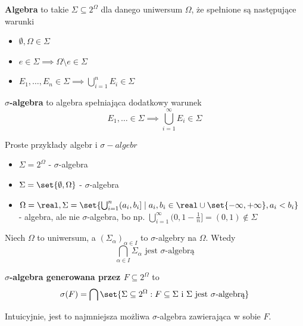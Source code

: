 \begin{definition}
	\textbf{Algebra} to takie \(\Sigma \subseteq 2^{\Omega}\) dla danego uniwersum \(\Omega\), że spełnione są następujące warunki
	\begin{itemize}
		\item \(\emptyset, \Omega \in \Sigma\)
		\item \(e \in \Sigma \implies \Omega \setminus e \in \Sigma\)
		\item \(E_1, \dots, E_n \in \Sigma \implies \bigcup_{i=1}^n E_i \in \Sigma\)
	\end{itemize}
\end{definition}

\begin{definition}
	\label{sigma-algebra-definition}
	\textbf{\(\sigma\)-algebra} to algebra spełniająca dodatkowy warunek
	\[
		E_1, \dots \in \Sigma \implies \bigcup_{i=1}^{\infty} E_i \in \Sigma
	\]
\end{definition}

\begin{example}
	Proste przykłady algebr i \(\sigma-algebr\)
	\begin{itemize}
		\item \(\Sigma = 2^{\Omega}\) - \(\sigma\)-algebra
		\item \(\Sigma = \set{\emptyset, \Omega}\) - \(\sigma\)-algebra
		\item \(\Omega = \real, \Sigma = \set{\bigcup_{i=1}^n (a_i, b_i] \mid a_i, b_i \in \real \cup \set{-\infty, +\infty}, a_i < b_i}\) - algebra, ale nie \(\sigma\)-algebra, bo np. \(\bigcup_{i=1}^\infty (0, 1 - \frac{1}{n}] = (0, 1) \notin \Sigma\)
	\end{itemize}
\end{example}

\begin{lemma}
	Niech \(\Omega\) to uniwersum, a \((\Sigma_\alpha)_{\alpha \in I}\) to \(\sigma\)-algebry na \(\Omega\). Wtedy
	\[
		\bigcap_{\alpha \in I} \Sigma_\alpha \text{ jest \(\sigma\)-algebrą}
	\]
\end{lemma}

\begin{definition}
	\textbf{\(\sigma\)-algebra generowana przez \(F \subseteq 2^\Omega\)} to
	\[
		\sigma(F) = \bigcap \set{\Sigma \subseteq 2^\Omega : F \subseteq \Sigma \text{ i } \Sigma \text{ jest } \sigma \text{-algebrą}}
	\]

	Intuicyjnie, jest to najmniejsza możliwa \(\sigma\)-algebra zawierająca w sobie \(F\).
\end{definition}

